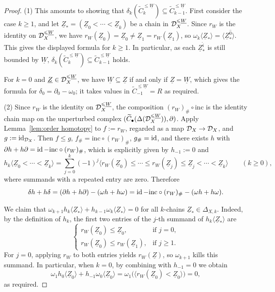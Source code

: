 \documentclass[a4paper,leqno]{amsart}
\begin{document}
\begin{proof}
(1) This amounts to showing that $\delta_k(\widetilde{C}_k^{\le\underline{W}}) \subseteq \widetilde{C}_{k-1}^{\le\underline{W}}$.  First consider the case $k\geq1$, and let $\underline{Z}_\ast=(\underline{Z}_0<\cdots<\underline{Z}_k)$ be a chain in $\mathcal D_X^{\leqslant\underline{W}}$. 
Since $r_W$ is the identity on $\mathcal D_X^{\leqslant\underline{W}}$, we have $r_W(\underline{Z}_0)=\underline{Z}_0\neq\underline{Z}_1=r_W(\underline{Z}_1)$, so $\omega_k\langle\underline{Z}_\ast\rangle=\langle\underline{Z}_\ast^{\widehat{0}}\rangle$. This gives the displayed formula for $k\geq1$. In particular, as each $\underline{Z}_\ast^{\widehat{i}}$ is still bounded by $\underline{W}$, $\delta_k(\widetilde{C}_k^{\le\underline{W}})\subseteq \widetilde{C}_{k-1}^{\leq\underline{W}}$ holds.

For $k=0$ and $\underline{Z}\in\mathcal D_X^{\leqslant\underline{W}}$, we have $\underline{W}\subseteq\underline{Z}$ if and only if $\underline{Z}=\underline{W}$, which gives the formula for $\delta_0=\partial_0-\omega_0$; it takes values in $\widetilde{C}_{-1}^{\leq\underline{W}}=R$ as required.

\medskip

(2) Since $r_W$ is the identity on $\mathcal D_X^{\leqslant\underline{W}}$, the composition $(r_W)_\#\circ\mathrm{inc}$ is the identity chain map on the unperturbed complex $(\widetilde{C}_\bullet(\Delta(\mathcal D_X^{\leqslant \underline{W}})),\partial)$.  Apply Lemma~\ref{lem:order homotopy} to $f:=r_W$, regarded as a map $\mathcal D_X\to\mathcal D_X$, and $g:=\operatorname{id}_{\mathcal D_X}$. Then $f\leq g$, $f_\#=\mathrm{inc}\circ(r_W)_\#$, $g_\#=\operatorname{id}$, and there exists $h$ with $\partial h+h\partial=\operatorname{id}-\mathrm{inc}\circ(r_W)_\#$, which is explicitly given by $h_{-1}:=0$ and
\[
 h_k\langle\underline{Z}_0<\cdots<\underline{Z}_k\rangle
 =\sum_{j=0}^k(-1)^{j}
 \langle r_W(\underline{Z}_0)\leq\cdots\leq r_W(\underline{Z}_{j})\leq\underline{Z}_{j}<\cdots<\underline{Z}_k\rangle
 \qquad(k\geq0),
\]
where summands with a repeated entry are zero. Therefore
\[
 \delta h+h\delta=(\partial h+h\partial)-(\omega h+h\omega)=\operatorname{id}-\mathrm{inc}\circ(r_W)_\#-(\omega h+h\omega).
\]

We claim that $\omega_{k+1}h_k\langle\underline{Z}_\ast\rangle+h_{k-1}\omega_k\langle\underline{Z}_\ast\rangle=0$ for all $k$-chains $\underline{Z}_\ast\in \Delta_{X,k}$.  
Indeed, by the definition of $h_k$, the first two entries of the $j$-th summand of $h_k\langle\underline{Z}_\ast\rangle$ are
\begin{equation}\label{eq:first two entries}
 \begin{cases}
 r_W(\underline{Z}_0)\leq\underline{Z}_0, & \text{if }j=0,\\
 r_W(\underline{Z}_0)\leq r_W(\underline{Z}_1), & \text{if }j\geq1.
 \end{cases}
\end{equation}
For $j=0$, applying $r_W$ to both entries yields $r_W(\underline{Z})$, so $\omega_{k+1}$ kills this summand.  In particular, when $k=0$, by combining with $h_{-1}=0$ we obtain
\[
\omega_{1}h_0\langle \underline{Z}_0 \rangle + h_{-1}\omega_0\langle \underline{Z}_0\rangle = \omega_1 \bigl( \langle r_W(\underline{Z}_0) < \underline{Z}_0 \rangle \bigr) = 0,
\]
as required.


\end{proof}
\end{document}
